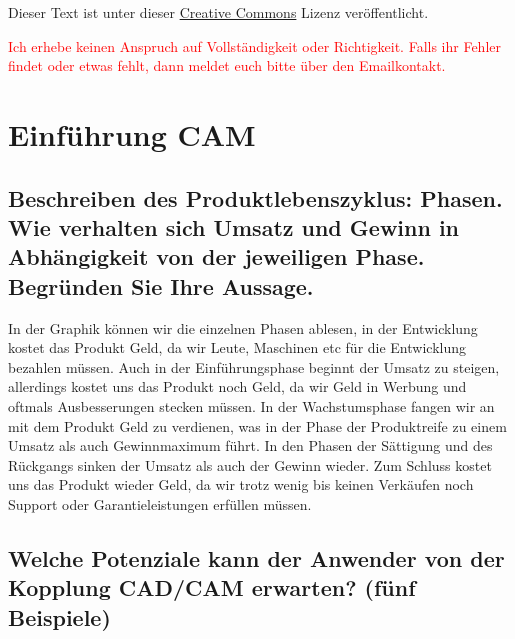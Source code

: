 

\usepackage{paralist}



\maketitle

Dieser Text ist unter dieser \href{http://creativecommons.org/licenses/by-nc-sa/3.0/}{Creative Commons} Lizenz veröffentlicht.

\textcolor{red}{Ich erhebe keinen Anspruch auf Vollständigkeit oder Richtigkeit. Falls ihr Fehler findet oder etwas fehlt, dann meldet euch bitte über den Emailkontakt.}


\tableofcontents

\newpage

\section{Einführung CAM}

\subsection*{Beschreiben des Produktlebenszyklus: 
Phasen. Wie verhalten sich Umsatz und Gewinn in Abhängigkeit von der 
jeweiligen Phase. Begründen Sie Ihre Aussage. }


\begin{figure}[h]
\centering
\end{figure}


In der Graphik können wir die einzelnen Phasen ablesen, in der Entwicklung kostet das Produkt Geld, da wir Leute, Maschinen etc für die Entwicklung bezahlen müssen. Auch in der Einführungsphase beginnt der Umsatz zu steigen, allerdings kostet uns das Produkt noch Geld, da wir Geld in Werbung und oftmals Ausbesserungen stecken müssen. In der Wachstumsphase fangen wir an mit dem Produkt Geld zu verdienen, was in der Phase der Produktreife zu einem Umsatz als auch Gewinnmaximum führt. In den Phasen der Sättigung und des Rückgangs sinken der Umsatz als auch der Gewinn wieder. Zum Schluss kostet uns das Produkt wieder Geld, da wir trotz wenig bis keinen Verkäufen noch Support oder Garantieleistungen erfüllen müssen.


\subsection*{Welche Potenziale kann der Anwender von der Kopplung CAD/CAM erwarten? 
(fünf Beispiele) }


